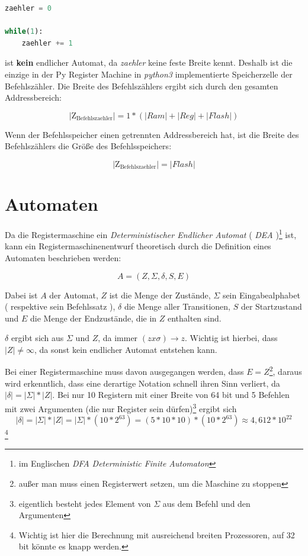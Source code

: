 \documentclass[a4paper,12pt,oneside]{scrreprt}
\begin{document}
\begin{lstlisting}[frame=single,language=python]
zaehler = 0

while(1):
	zaehler += 1
\end{lstlisting}

ist \textbf{kein} endlicher Automat, da \textit{zaehler} keine feste Breite kennt. 
Deshalb ist die einzige in der Py Register Machine in \textit{python3} implementierte Speicherzelle der Befehlszähler.
Die Breite des Befehlszählers ergibt sich durch den gesamten Addressbereich:

$$ \mathrm{|Z_{Befehlszaehler}|} = 1 * ( |Ram| + |Reg| + |Flash| ) $$

Wenn der Befehlsspeicher einen getrennten Addressbereich hat, ist die Breite des Befehlszählers die Größe des Befehlsspeichers:

$$ \mathrm{|Z_{Befehlszaehler}|} = |Flash|  $$

\section{Automaten}

Da die Registermaschine ein \textit{Deterministischer Endlicher Automat} ( \textit{DEA} )\footnote{im Englischen \textit{DFA Deterministic Finite Automaton}} ist, kann ein Registermaschinenentwurf theoretisch durch die Definition eines Automaten beschrieben werden:

$$ A = ( Z , \Sigma , \delta , S , E ) $$

Dabei ist $A$ der Automat, $Z$ ist die Menge der Zustände, $\Sigma$ sein Eingabealphabet ( respektive sein Befehlssatz ), 
$\delta$ die Menge aller Transitionen, $S$ der Startzustand und $E$ die Menge der Endzustände, die in $Z$ enthalten sind.

$\delta$ ergibt sich aus $\Sigma$ und $Z$, da immer $ ( z x \sigma ) \rightarrow z $. Wichtig ist hierbei, dass $|Z| \neq \infty$,
da sonst kein endlicher Automat entstehen kann.

Bei einer Registermaschine muss davon ausgegangen werden, dass $ E = Z $\footnote{außer man muss einen Registerwert setzen, um die Maschine zu stoppen}, daraus wird erkenntlich, dass eine derartige Notation schnell ihren Sinn verliert, da $ |\delta| = |\Sigma| * | Z | $.
Bei nur 10 Registern mit einer Breite von 64 bit und 5 Befehlen mit zwei Argumenten (die nur Register sein dürfen)\footnote{eigentlich besteht jedes Element von $\Sigma$ aus dem Befehl und den Argumenten} ergibt sich 
$$ |\delta| = |\Sigma| * |Z| = |\Sigma| * (10 * 2^{63}) = (5 * 10 * 10) * (10 * 2^{63}) \approx  4,612*10^{22} $$ \footnote{Wichtig ist hier die Berechnung mit ausreichend breiten Prozessoren, auf 32 bit könnte es knapp werden.}
\end{document}
